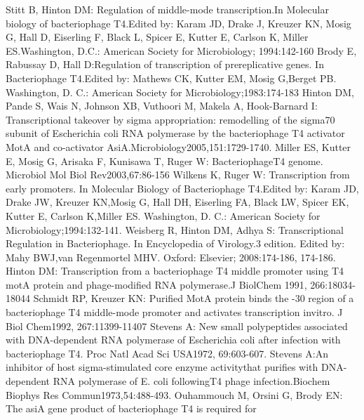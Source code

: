 \documentclass[14pt]{extarticle}
\begin{document}
\newpage
\begin{thebibliography}{9}
     {Stitt B, Hinton DM: Regulation of middle-mode transcription.In Molecular biology  of  
    bacteriophage  T4.Edited by: Karam JD, Drake J, Kreuzer KN, Mosig G, Hall D, Eiserling F, Black L, Spicer E, Kutter 
    E, Carlson K, Miller ES.Washington, D.C.: American Society for Microbiology; 1994:142-160}
     {Brody E, Rabussay D, Hall D:Regulation of transcription of prereplicative genes. In Bacteriophage
    T4.Edited by: Mathews CK, Kutter EM, Mosig G,Berget PB. Washington, D. C.: American Society for 
    Microbiology;1983:174-183}
     Hinton DM, Pande S, Wais N, Johnson XB, Vuthoori M, Makela A, Hook-Barnard I: Transcriptional 
    takeover by sigma appropriation: remodelling of the sigma70 subunit of Escherichia coli RNA polymerase by the 
    bacteriophage T4 activator MotA and co-activator AsiA.Microbiology2005,151:1729-1740.
     Miller ES, Kutter E, Mosig G, Arisaka F, Kunisawa T, Ruger W: BacteriophageT4 genome. Microbiol  
    Mol  Biol  Rev2003,67:86-156
     Wilkens K, Ruger W: Transcription from early promoters. In Molecular Biology  of  Bacteriophage  
    T4.Edited by: Karam JD, Drake JW, Kreuzer KN,Mosig G, Hall DH, Eiserling FA, Black LW, Spicer EK, Kutter E, Carlson 
    K,Miller ES. Washington, D. C.: American Society for Microbiology;1994:132-141.
     Weisberg R, Hinton DM, Adhya S: Transcriptional Regulation in Bacteriophage. In Encyclopedia  of  
    Virology.3 edition. Edited by: Mahy BWJ,van Regenmortel MHV. Oxford: Elsevier; 2008:174-186, 174-186.
     Hinton DM: Transcription from a bacteriophage T4 middle promoter using T4 motA protein and 
    phage-modified RNA polymerase.J  BiolChem 1991, 266:18034-18044
     Schmidt RP, Kreuzer KN: Purified MotA protein binds the -30 region of a bacteriophage T4 
    middle-mode promoter and activates transcription invitro. J  Biol  Chem1992, 267:11399-11407
     Stevens A: New small polypeptides associated with DNA-dependent RNA polymerase of Escherichia coli
    after infection with bacteriophage T4. Proc  Natl  Acad  Sci  USA1972, 69:603-607.
     Stevens A:An inhibitor of host sigma-stimulated core enzyme activitythat purifies with 
    DNA-dependent RNA polymerase of E. coli followingT4 phage infection.Biochem  Biophys  Res  Commun1973,54:488-493.
     Ouhammouch M, Orsini G, Brody EN: The asiA gene product of bacteriophage T4 is required for 

\end{thebibliography}
\end{document}
